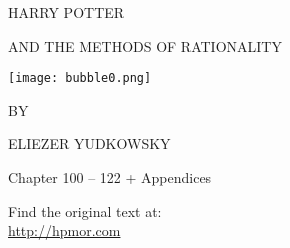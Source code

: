 



\begin{center}
\thispagestyle{empty}
{\hp
\Huge\MakeUppercase{Harry Potter}\vspace*{0.5cm}

\Large\MakeUppercase{and the Methods of Rationality} %
 
\texttt{[image: bubble0.png]} 

\Large BY \vspace*{.25cm}

\huge ELIEZER YUDKOWSKY%

\normalsize

\vspace*{1\baselineskip}
}

Chapter 100 -- 122 + Appendices

\vspace{3cm}
Find the original text at:\\
\url{http://hpmor.com} \\

\end{center}
\clearpage
